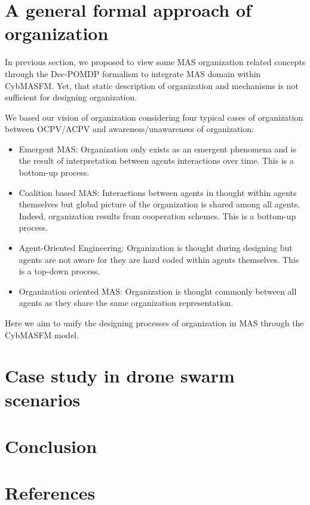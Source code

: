 \documentclass[conference]{IEEEtran}
\begin{document}
\section{A general formal approach of organization}

In previous section, we proposed to view some MAS organization related concepts through the Dec-POMDP formalism to integrate MAS domain within CybMASFM. Yet, that static description of organization and mechanisms is not sufficient for designing organization.

We based our vision of organization considering four typical cases of organization between OCPV/ACPV and awareness/unawareness of organization\cite{picard2009reorganisation}:

\begin{itemize}
    \item Emergent MAS: Organization only exists as an emergent phenomena and is the result of interpretation between agents interactions over time. This is a bottom-up process.
    \item Coalition based MAS: Interactions between agents in thought within agents themselves but global picture of the organization is shared among all agents. Indeed, organization results from cooperation schemes. This is a bottom-up process.
    \item Agent-Oriented Engineering: Organization is thought during designing but agents are not aware for they are hard coded within agents themselves. This is a top-down process.
    \item Organization oriented MAS: Organization is thought commonly between all agents as they share the same organization representation.
\end{itemize}

Here we aim to unify the designing processes of organization in MAS through the CybMASFM model.


\section{Case study in drone swarm scenarios}


\section{Conclusion}


\section*{References}

% 



\end{document}
